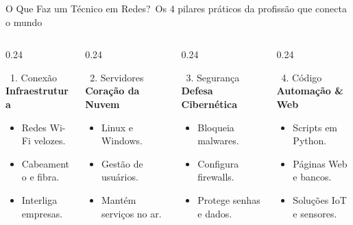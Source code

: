 \begin{frame}{O Que Faz um Técnico em Redes?}{\faUserAstronaut\ Os 4 pilares práticos da profissão que conecta o mundo}
  \begin{columns}[t]
    \begin{column}{0.24\textwidth}
      \begin{bluecard}{\faNetworkWired\ 1. Conexão}
        \tiny
        \textbf{Infraestrutura}
        \begin{itemize}\setlength{\itemsep}{0.12em}
          \item Redes Wi-Fi velozes.
          \item Cabeamento e fibra.
          \item Interliga empresas.
        \end{itemize}
      \end{bluecard}
    \end{column}
    
    \begin{column}{0.24\textwidth}
      \begin{greencard}{\faServer\ 2. Servidores}
        \tiny
        \textbf{Coração da Nuvem}
        \begin{itemize}\setlength{\itemsep}{0.12em}
          \item Linux e Windows.
          \item Gestão de usuários.
          \item Mantém serviços no ar.
        \end{itemize}
      \end{greencard}
    \end{column}
    
    \begin{column}{0.24\textwidth}
      \begin{redcard}{\faLock\ 3. Segurança}
        \tiny
        \textbf{Defesa Cibernética}
        \begin{itemize}\setlength{\itemsep}{0.12em}
          \item Bloqueia malwares.
          \item Configura firewalls.
          \item Protege senhas e dados.
        \end{itemize}
      \end{redcard}
    \end{column}
    
    \begin{column}{0.24\textwidth}
      \begin{purplecard}{\faCode\ 4. Código}
        \tiny
        \textbf{Automação \& Web}
        \begin{itemize}\setlength{\itemsep}{0.12em}
          \item Scripts em Python.
          \item Páginas Web e bancos.
          \item Soluções IoT e sensores.
        \end{itemize}
      \end{purplecard}
    \end{column}
  \end{columns}
  

\end{frame}
